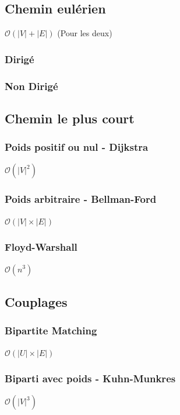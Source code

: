 \documentclass[8pt]{article}
\begin{document}
        \subsection{Chemin eulérien}
            $\mathcal{O}(\lvert V \rvert  + \lvert E \rvert)$ (Pour les deux)
            \subsubsection{Dirigé}
            {\scriptsize}
            \subsubsection{Non Dirigé}
            {\scriptsize}
        \subsection{Chemin le plus court}
            \subsubsection{Poids positif ou nul - Dijkstra}
            $\mathcal{O}(\lvert V \rvert^2)$
            {\scriptsize}
            \subsubsection{Poids arbitraire - Bellman-Ford}
            $\mathcal{O}(\lvert V \rvert  \times \lvert E \rvert)$
            {\scriptsize}
            \subsubsection{Floyd-Warshall}
            $\mathcal{O}(n^3)$
            {\scriptsize}
        \subsection{Couplages}
            \subsubsection{Bipartite Matching}
            $\mathcal{O}(\lvert U \rvert  \times \lvert E \rvert)$
            \subsubsection{Biparti avec poids - Kuhn-Munkres}
            $\mathcal{O}(\lvert V \rvert ^3)$
            {\scriptsize}
\end{document}

